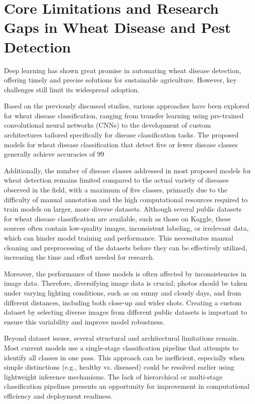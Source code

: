 \section{Core Limitations and Research Gaps in Wheat Disease and Pest Detection}
Deep learning has shown great promise in automating wheat disease detection, offering timely and precise solutions for sustainable agriculture. However, key challenges still limit its widespread adoption.

Based on the previously discussed studies, various approaches have been explored for wheat disease classification, ranging from transfer learning using pre-trained convolutional neural networks (CNNs) to the development of custom architectures tailored specifically for disease classification tasks. The proposed models for wheat disease classification that detect five or fewer disease classes generally achieve accuracies of 99%

Additionally, the number of disease classes addressed in most proposed models for wheat detection remains limited compared to the actual variety of diseases observed in the field, with a maximum of five classes, primarily due to the difficulty of manual annotation and the high computational resources required to train models on larger, more diverse datasets. Although several public datasets for wheat disease classification are available, such as those on Kaggle, these sources often contain low-quality images, inconsistent labeling, or irrelevant data, which can hinder model training and performance. This necessitates manual cleaning and preprocessing of the datasets before they can be effectively utilized, increasing the time and effort needed for research.

Moreover, the performance of these models is often affected by inconsistencies in image data. Therefore, diversifying image data is crucial; photos should be taken under varying lighting conditions, such as on sunny and cloudy days, and from different distances, including both close-up and wider shots. Creating a custom dataset by selecting diverse images from different public datasets is important to ensure this variability and improve model robustness.

Beyond dataset issues, several structural and architectural limitations remain. Most current models use a single-stage classification pipeline that attempts to identify all classes in one pass. This approach can be inefficient, especially when simple distinctions (e.g., healthy vs. diseased) could be resolved earlier using lightweight inference mechanisms. The lack of hierarchical or multi-stage classification pipelines presents an opportunity for improvement in computational efficiency and deployment readiness.

